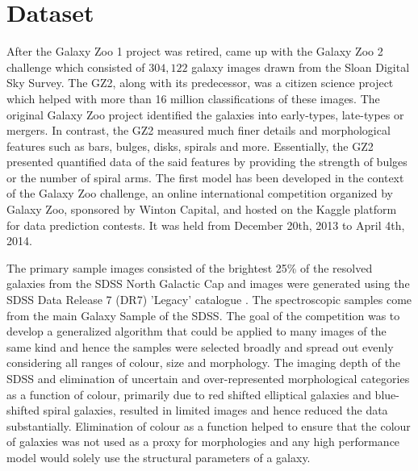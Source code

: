 \documentclass[fleqn,usenatbib]{mnras}
\begin{document}
\section{Dataset}
\hspace{0.25 in}After the Galaxy Zoo 1 \citep{2008MNRAS.389.1179L} project was retired, \citet{Willett_2013} came up with the Galaxy Zoo 2 challenge which consisted of $304,122$ galaxy images drawn from the Sloan Digital Sky Survey. The GZ2, along with its predecessor, was a citizen science project which helped with more than 16 million classifications of these images. The original Galaxy Zoo project identified the galaxies into early-types, late-types or mergers. In contrast, the GZ2 measured much finer details and morphological features such as bars, bulges, disks, spirals and more. Essentially, the GZ2 presented quantified data of the said features by providing the strength of bulges or the number of spiral arms. The first model has been developed in the context of the Galaxy Zoo challenge, an online international competition organized by Galaxy Zoo, sponsored by Winton Capital, and hosted on the Kaggle platform for data prediction contests. It was held from December 20th, 2013 to April 4th, 2014.

The primary sample images consisted of the brightest 25\% of the resolved galaxies from the SDSS North Galactic Cap and images were generated using the SDSS Data Release 7 (DR7) 'Legacy' catalogue \citep{Abazajian2009}. The spectroscopic samples come from the main Galaxy Sample of the SDSS. The goal of the competition was to develop a generalized algorithm that could be applied to many images of the same kind and hence the samples were selected broadly and spread out evenly considering all ranges of colour, size and morphology. The imaging depth of the SDSS and elimination of uncertain and over-represented morphological categories as a function of colour, primarily due to red shifted elliptical galaxies and blue-shifted spiral galaxies, resulted in limited images and hence reduced the data substantially. Elimination of colour as a function helped to ensure that the colour of galaxies was not used as a proxy for morphologies and any high performance model would solely use the structural parameters of a galaxy.
\end{document}
